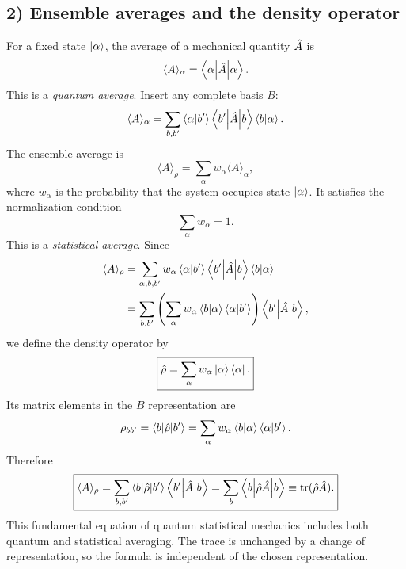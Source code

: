 \subsection*{2) Ensemble averages and the density operator}
For a fixed state $\left|\alpha\right\rangle$, the average of a mechanical quantity $\hat{A}$ is
\begin{equation}
\langle A\rangle_\alpha=\left\langle\alpha\middle|\hat{A}\middle|\alpha\right\rangle.
\end{equation}
This is a \emph{quantum average}. Insert any complete basis $B$:
\begin{equation}
\langle A\rangle_\alpha
=\sum_{b,b'}\left\langle\alpha\middle|b'\right\rangle\left\langle b'\middle|\hat{A}\middle|b\right\rangle\left\langle b\middle|\alpha\right\rangle.
\end{equation}
The ensemble average is
\begin{equation}
\langle A\rangle_\rho=\sum_\alpha w_\alpha\langle A\rangle_\alpha,
\end{equation}
where $w_\alpha$ is the probability that the system occupies state $\left|\alpha\right\rangle$. It satisfies the normalization condition
\begin{equation}
\sum_\alpha w_\alpha=1.
\end{equation}
This is a \emph{statistical average}. Since
\begin{equation}\begin{aligned}
\langle A\rangle_\rho&=\sum_{\alpha,b,b'}w_\alpha\left\langle\alpha\middle|b'\right\rangle\left\langle b'\middle|\hat{A}\middle|b\right\rangle\left\langle b\middle|\alpha\right\rangle\\
&=\sum_{b,b'}\left(\sum_\alpha w_\alpha\left\langle b\middle|\alpha\right\rangle\left\langle\alpha\middle|b'\right\rangle\right)
\left\langle b'\middle|\hat{A}\middle|b\right\rangle,
\end{aligned}\end{equation}
we define the density operator by
\begin{equation}
\boxed{\hat{\rho}=\sum_\alpha w_\alpha\left|\alpha\right\rangle\left\langle\alpha\right|.}
\end{equation}
Its matrix elements in the $B$ representation are
\begin{equation}
\rho_{bb'}=\left\langle b\middle|\hat{\rho}\middle|b'\right\rangle
=\sum_\alpha w_\alpha\left\langle b\middle|\alpha\right\rangle\left\langle\alpha\middle|b'\right\rangle.
\end{equation}
Therefore
\begin{equation}
\boxed{\langle A\rangle_\rho=\sum_{b,b'}\left\langle b\middle|\hat{\rho}\middle|b'\right\rangle\left\langle b'\middle|\hat{A}\middle|b\right\rangle
=\sum_b\left\langle b\middle|\hat{\rho}\hat{A}\middle|b\right\rangle
\equiv\operatorname{tr}(\hat{\rho}\hat{A}).}
\end{equation}
This fundamental equation of quantum statistical mechanics includes both quantum and statistical averaging. The trace is unchanged by a change of representation, so the formula is independent of the chosen representation.

